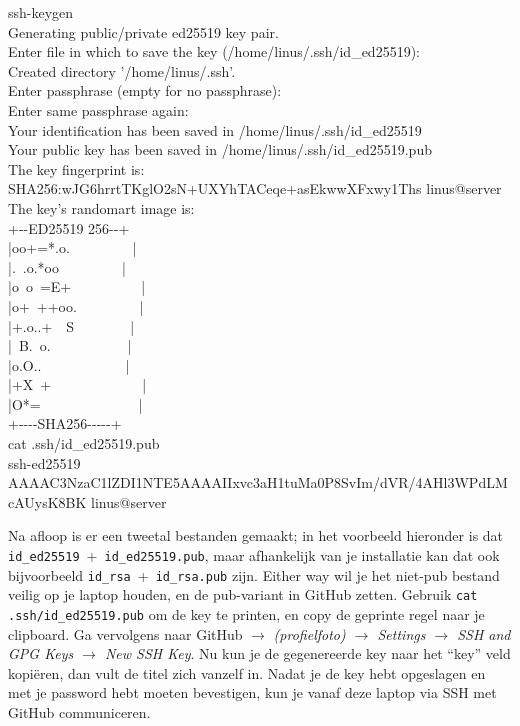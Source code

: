 \begin{bash}
\userprompt ssh-keygen \\
Generating public/private ed25519 key pair. \\
Enter file in which to save the key (/home/linus/.ssh/id\_ed25519): \keys{\return}\\
Created directory '/home/linus/.ssh'. \\
Enter passphrase (empty for no passphrase): \keys{\return}\\
Enter same passphrase again: \keys{\return}\\
Your identification has been saved in /home/linus/.ssh/id\_ed25519 \\
Your public key has been saved in /home/linus/.ssh/id\_ed25519.pub \\
The key fingerprint is: \\
SHA256:wJG6hrrtTKglO2sN+UXYhTACeqe+asEkwwXFxwy1Ths linus@server \\
The key's randomart image is: \\
  +-\phantom{}-\lbrack ED25519 256\rbrack -\phantom{}-+ \\
|oo+=*.o.\ \ \ \ \ \ \ \ \ | \\
|.\ .o.*oo\ \ \ \ \ \ \ \ \ | \\
|o\ o\ =E+\ \ \ \ \ \ \ \ \ \ | \\
|o+\ ++oo.\ \ \ \ \ \ \ \ \ | \\
|+.o..+\ \ S\ \ \ \ \ \ \ \ | \\
|\ B.\ o.\ \ \ \ \ \ \ \ \ \ \ | \\
|o.O..\ \ \ \ \ \ \ \ \ \ \ \ | \\
|+X\ +\ \ \ \ \ \ \ \ \ \ \ \ \ | \\
|O*=\ \ \ \ \ \ \ \ \ \ \ \ \ \ | \\
  +-\phantom{}-\phantom{}-\phantom{}-\lbrack SHA256\rbrack -\phantom{}-\phantom{}-\phantom{}-\phantom{}-+\\
\userprompt cat .ssh/id\_ed25519.pub \\
ssh-ed25519 AAAAC3NzaC1lZDI1NTE5AAAAIIxvc3aH1tuMa0P8SvIm/dVR/4AHl3WPdLMcAUysK8BK linus@server
\end{bash}

Na afloop is er een tweetal bestanden gemaakt; in het voorbeeld hieronder is dat \texttt{id\_ed25519}\ +\ \texttt{id\_ed25519.pub}, maar afhankelijk van je installatie kan dat ook bijvoorbeeld \texttt{id\_rsa}\ +\ \texttt{id\_rsa.pub} zijn.  Either way wil je het niet-pub bestand veilig op je laptop houden, en de pub-variant in GitHub zetten. Gebruik \texttt{cat .ssh/id\_ed25519.pub} om de key te printen, en copy de geprinte regel naar je clipboard. Ga vervolgens naar GitHub $\to$ \emph{(profielfoto) $\to$ Settings $\to$ SSH and GPG Keys $\to$ New SSH Key}. Nu kun je de gegenereerde key naar het \enquote{key} veld kopi\"eren, dan vult de titel zich vanzelf in. Nadat je de key hebt opgeslagen en met je password hebt moeten bevestigen, kun je vanaf deze laptop via SSH met GitHub communiceren.

